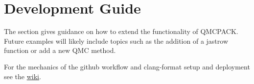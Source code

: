 \chapter{Development Guide}
\label{chap:developguide}

The section gives guidance on how to extend the functionality of QMCPACK. Future examples will likely include topics such as the addition of a jastrow function or add a new QMC method.

For the mechanics of the github workflow and clang-format setup and deployment see the \href{https://github.com/QMCPACK/qmcpack/wiki}{\qmcpack wiki}.






